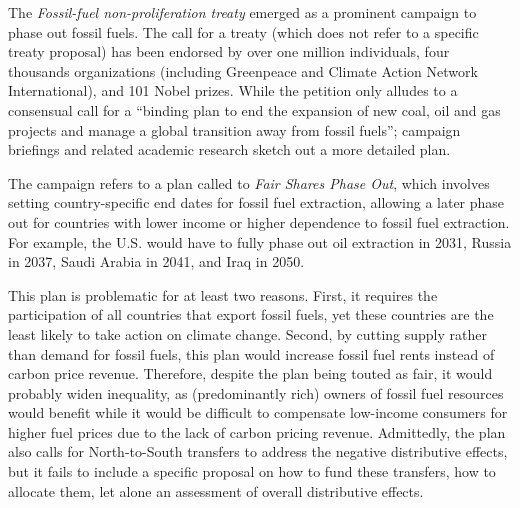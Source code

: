 \documentclass[12pt,english]{article}
\begin{document}
The \textit{Fossil-fuel non-proliferation treaty} emerged as a prominent campaign to phase out fossil fuels. The call for a treaty (which does not refer to a specific treaty proposal) has been endorsed by over one million individuals, four thousands organizations (including Greenpeace and Climate Action Network International), and 101 Nobel prizes. While the petition only alludes to a consensual call for a ``binding plan to end the expansion of new coal, oil and gas projects and manage a global transition away from fossil fuels''; campaign briefings and related academic research sketch out a more detailed plan.\citep{civil_society_equity_review_fair_2021,civil_society_equity_review_equitable_2023,calverley_phaseout_2022,fossil_fuel_non-proliferation_treaty_global_2023}

The campaign refers to a plan called to \textit{Fair Shares Phase Out}, which involves setting country-specific end dates for fossil fuel extraction,\citep{civil_society_equity_review_equitable_2023,calverley_phaseout_2022} allowing a later phase out for countries with lower income or higher dependence to fossil fuel extraction. For example, the U.S. would have to fully phase out oil extraction in 2031, Russia in 2037, Saudi Arabia in 2041, and Iraq in 2050.

This plan is problematic for at least two reasons. First, it requires the participation of all countries that export fossil fuels, yet these countries are the least likely to take action on climate change. Second, by cutting supply rather than demand for fossil fuels, this plan would increase fossil fuel rents instead of carbon price revenue. Therefore, despite the plan being touted as fair, it would probably widen inequality, as (predominantly rich) owners of fossil fuel resources would benefit while it would be difficult to compensate low-income consumers for higher fuel prices due to the lack of carbon pricing revenue. Admittedly, the plan also calls for North-to-South transfers to address the negative distributive effects, but it fails to include a specific proposal on how to fund these transfers, how to allocate them, let alone an assessment of overall distributive effects. 
\end{document}

